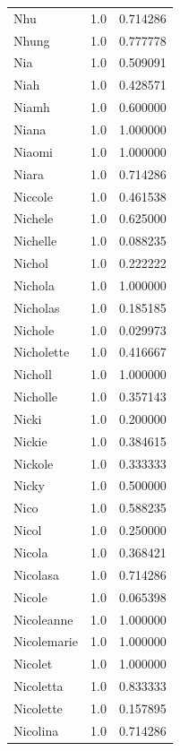 \documentclass[
  letterpaper,
  DIV=11,
  numbers=noendperiod]{scrreprt}
\begin{document}
\begin{tabular}{lrr}
Nhu             &   1.0 &   0.714286 \\
Nhung           &   1.0 &   0.777778 \\
Nia             &   1.0 &   0.509091 \\
Niah            &   1.0 &   0.428571 \\
Niamh           &   1.0 &   0.600000 \\
Niana           &   1.0 &   1.000000 \\
Niaomi          &   1.0 &   1.000000 \\
Niara           &   1.0 &   0.714286 \\
Niccole         &   1.0 &   0.461538 \\
Nichele         &   1.0 &   0.625000 \\
Nichelle        &   1.0 &   0.088235 \\
Nichol          &   1.0 &   0.222222 \\
Nichola         &   1.0 &   1.000000 \\
Nicholas        &   1.0 &   0.185185 \\
Nichole         &   1.0 &   0.029973 \\
Nicholette      &   1.0 &   0.416667 \\
Nicholl         &   1.0 &   1.000000 \\
Nicholle        &   1.0 &   0.357143 \\
Nicki           &   1.0 &   0.200000 \\
Nickie          &   1.0 &   0.384615 \\
Nickole         &   1.0 &   0.333333 \\
Nicky           &   1.0 &   0.500000 \\
Nico            &   1.0 &   0.588235 \\
Nicol           &   1.0 &   0.250000 \\
Nicola          &   1.0 &   0.368421 \\
Nicolasa        &   1.0 &   0.714286 \\
Nicole          &   1.0 &   0.065398 \\
Nicoleanne      &   1.0 &   1.000000 \\
Nicolemarie     &   1.0 &   1.000000 \\
Nicolet         &   1.0 &   1.000000 \\
Nicoletta       &   1.0 &   0.833333 \\
Nicolette       &   1.0 &   0.157895 \\
Nicolina        &   1.0 &   0.714286 \\

\end{tabular}
\end{document}
